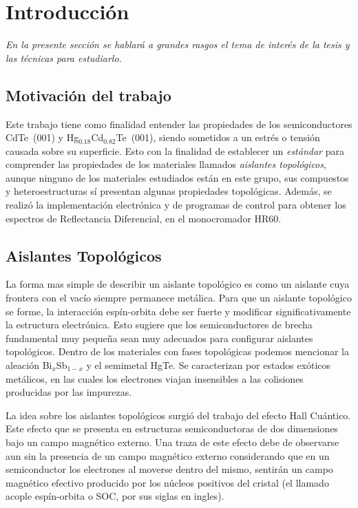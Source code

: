 \chapter{Introducción}
\label{chap:introduction}
\textit{En la presente sección se hablará a grandes rasgos el tema de interés de la tesis
y las técnicas para estudiarlo.}
\vfill
\minitoc
\newpage

\section{Motivación del trabajo}
\label{ch1-why}
Este trabajo tiene como finalidad entender las propiedades de los semiconductores \mbox{CdTe (001)} y \mbox{Hg$_{0.18}$Cd$_{0.82}$Te (001)}, siendo sometidos a un estrés o tensión causada sobre su superficie. Esto con la finalidad de establecer un \textit{estándar} para comprender las propiedades de los materiales llamados \textit{aislantes topológicos}, aunque ninguno de los materiales estudiados están en este grupo, sus compuestos y heteroestructuras sí presentan algunas propiedades topológicas. Además, se realizó la implementación electrónica y de programas de control para obtener los espectros de Reflectancia Diferencial, en el monocromador HR60.

\section{Aislantes Topológicos}
\label{ch1-ti}
La forma mas simple de describir un aislante topológico es como un aislante cuya frontera con el vacío siempre permanece metálica. Para que un aislante topológico se forme, la interacción espín-orbita debe ser fuerte y modificar significativamente la estructura electrónica. Esto sugiere que los semiconductores de brecha fundamental muy pequeña sean muy adecuados para configurar aislantes topológicos. Dentro de los materiales con fases topológicas podemos mencionar la aleación \mbox{Bi$_{x}$Sb$_{1-x}$} y el semimetal HgTe\cite{Konig2007, Moore2010}. Se caracterizan por estados exóticos metálicos, en las cuales los electrones viajan insensibles a las colisiones producidas por las impurezas\cite{Moore2010, Konig2007}.

La idea sobre los aislantes topológicos surgió del trabajo del efecto Hall Cuántico. Este efecto que se presenta en estructuras semiconductoras de dos dimensiones bajo un campo magnético externo\cite{Klitzing1980}. Una traza de este efecto debe de observarse aun sin la presencia de un campo magnético externo considerando que en un semiconductor los electrones al moverse dentro del mismo, sentirán un campo magnético efectivo producido por los núcleos positivos del cristal (el llamado acople espín-orbita o SOC, por sus siglas en ingles).

